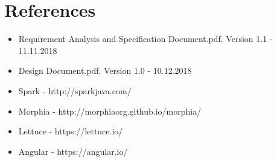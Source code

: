 \documentclass[a4paper, hidelinks, 12pt]{report}
\begin{document}
	\chapter{References}
	\begin{itemize}
		\item Requirement Analysis and Specification Document.pdf. Version 1.1 - 11.11.2018
		\item Design Document.pdf. Version 1.0 - 10.12.2018
		\item{Spark - http://sparkjava.com/}
		\item{Morphia - http://morphiaorg.github.io/morphia/}
		\item{Lettuce - https://lettuce.io/}
		\item{Angular - https://angular.io/}
		
	\end{itemize}
	
\end{document}
